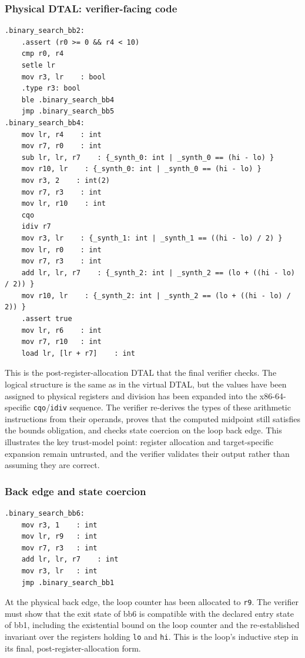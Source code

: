 \subsubsection{Physical DTAL: verifier-facing code}
\begin{verbatim}
.binary_search_bb2:
    .assert (r0 >= 0 && r4 < 10)
    cmp r0, r4
    setle lr
    mov r3, lr    : bool
    .type r3: bool
    ble .binary_search_bb4
    jmp .binary_search_bb5
.binary_search_bb4:
    mov lr, r4    : int
    mov r7, r0    : int
    sub lr, lr, r7    : {_synth_0: int | _synth_0 == (hi - lo) }
    mov r10, lr    : {_synth_0: int | _synth_0 == (hi - lo) }
    mov r3, 2    : int(2)
    mov r7, r3    : int
    mov lr, r10    : int
    cqo
    idiv r7
    mov r3, lr    : {_synth_1: int | _synth_1 == ((hi - lo) / 2) }
    mov lr, r0    : int
    mov r7, r3    : int
    add lr, lr, r7    : {_synth_2: int | _synth_2 == (lo + ((hi - lo) / 2)) }
    mov r10, lr    : {_synth_2: int | _synth_2 == (lo + ((hi - lo) / 2)) }
    .assert true
    mov lr, r6    : int
    mov r7, r10   : int
    load lr, [lr + r7]    : int
\end{verbatim}
This is the post-register-allocation DTAL that the final verifier checks. The logical structure is the same as in the virtual DTAL, but the values have been assigned to physical registers and division has been expanded into the x86-64-specific \texttt{cqo}/\texttt{idiv} sequence. The verifier re-derives the types of these arithmetic instructions from their operands, proves that the computed midpoint still satisfies the bounds obligation, and checks state coercion on the loop back edge. This illustrates the key trust-model point: register allocation and target-specific expansion remain untrusted, and the verifier validates their output rather than assuming they are correct.
\subsubsection{Back edge and state coercion}
\begin{verbatim}
.binary_search_bb6:
    mov r3, 1    : int
    mov lr, r9   : int
    mov r7, r3   : int
    add lr, lr, r7    : int
    mov r3, lr   : int
    jmp .binary_search_bb1
\end{verbatim}
At the physical back edge, the loop counter has been allocated to \texttt{r9}. The verifier must show that the exit state of bb6 is compatible with the declared entry state of bb1, including the existential bound on the loop counter and the re-established invariant over the registers holding \texttt{lo} and \texttt{hi}. This is the loop's inductive step in its final, post-register-allocation form.

